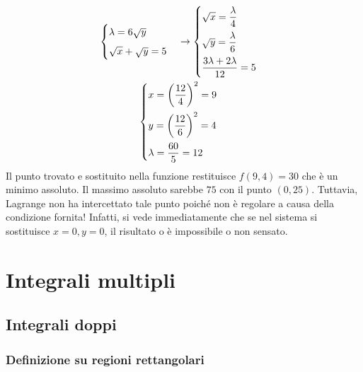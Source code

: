 \documentclass[a4paper]{article}
\begin{document}
\begin{gather*}
\begin{cases}
			\lambda = 6\sqrt{y} \vspace{.5em} \\
			\sqrt{x}+\sqrt{y} = 5
		\end{cases}
		\rightarrow
		\begin{cases}
			\sqrt{x} = \dfrac{\lambda}{4} \vspace{.5em} \\
			\sqrt{y} = \dfrac{\lambda}{6} \vspace{.5em} \\
			\dfrac{3\lambda + 2\lambda}{12} = 5
		\end{cases}
		\\
		\begin{cases}
			x = \left(\dfrac{12}{4}\right)^{2} = 9 \vspace{.5em} \\
			y = \left(\dfrac{12}{6}\right)^{2} = 4 \vspace{.5em} \\
			\lambda = \dfrac{60}{5} = 12
		\end{cases}
	\end{gather*}
	Il punto trovato e sostituito nella funzione restituisce $f\left(9,4\right) = 30$ che è un minimo assoluto. Il massimo assoluto sarebbe $75$ con il punto $\left(0,25\right)$. Tuttavia, Lagrange non ha intercettato tale punto poiché non è regolare a causa della condizione fornita! Infatti, si vede immediatamente che se nel sistema si sostituisce $x=0,y=0$, il risultato o è impossibile o non sensato.\newpage

	\section{Integrali multipli}\label{section: integrali multipli}

	\subsection{Integrali doppi}\label{subsection: integrali doppi}

	\subsubsection{Definizione su regioni rettangolari}\label{subsubsection: definizione su regioni rettangolari}
\end{document}
